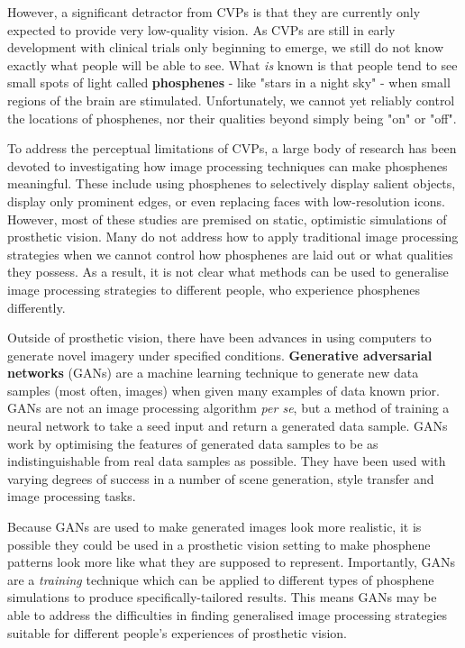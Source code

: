 \documentclass[11pt]{book}
\begin{document}
However, a significant detractor from CVPs is that they are currently only expected to provide very low-quality vision.
As CVPs are still in early development with clinical trials only beginning to emerge, we still do not know exactly what people will be able to see.
What \emph{is} known is that people tend to see small spots of light called \textbf{phosphenes} - like "stars in a night sky" - when small regions of the brain are stimulated.
Unfortunately, we cannot yet reliably control the locations of phosphenes, nor their qualities beyond simply being "on" or "off".

To address the perceptual limitations of CVPs, a large body of research has been devoted to investigating how image processing techniques can make phosphenes meaningful.
These include using phosphenes to selectively display salient objects, display only prominent edges, or even replacing faces with low-resolution icons.
However, most of these studies are premised on static, optimistic simulations of prosthetic vision.
Many do not address how to apply traditional image processing strategies when we cannot control how phosphenes are laid out or what qualities they possess.
As a result, it is not clear what methods can be used to generalise image processing strategies to different people, who experience phosphenes differently.

Outside of prosthetic vision, there have been advances in using computers to generate novel imagery under specified conditions.
\textbf{Generative adversarial networks} (GANs) are a machine learning technique to generate new data samples (most often, images) when given many examples of data known prior.
GANs are not an image processing algorithm \emph{per se}, but a method of training a neural network to take a seed input and return a generated data sample.
GANs work by optimising the features of generated data samples to be as indistinguishable from real data samples as possible.
They have been used with varying degrees of success in a number of scene generation, style transfer and image processing tasks.

Because GANs are used to make generated images look more realistic, it is possible they could be used in a prosthetic vision setting to make phosphene patterns look more like what they are supposed to represent.
Importantly, GANs are a \emph{training} technique which can be applied to different types of phosphene simulations to produce specifically-tailored results.
This means GANs may be able to address the difficulties in finding generalised image processing strategies suitable for different people's experiences of prosthetic vision.
\end{document}

